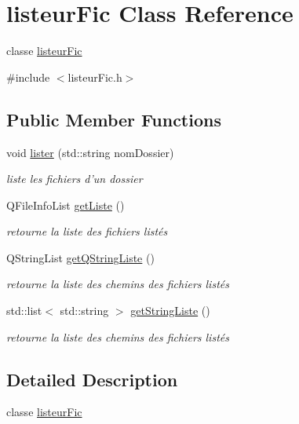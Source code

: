 \hypertarget{classlisteur_fic}{\section{listeur\-Fic Class Reference}
\label{classlisteur_fic}
}


classe \hyperlink{classlisteur_fic}{listeur\-Fic}  




{\ttfamily \#include $<$listeur\-Fic.\-h$>$}

\subsection*{Public Member Functions}
\begin{DoxyCompactItemize}
\item 
void \hyperlink{classlisteur_fic_a9a035fde2cef3b9d70fbabfd98923493}{lister} (std\-::string nom\-Dossier)
\begin{DoxyCompactList}\small\item\em liste les fichiers d'un dossier \end{DoxyCompactList}\item 
Q\-File\-Info\-List \hyperlink{classlisteur_fic_a319d2a5d9de00dc984907b9256a7552b}{get\-Liste} ()
\begin{DoxyCompactList}\small\item\em retourne la liste des fichiers listés \end{DoxyCompactList}\item 
Q\-String\-List \hyperlink{classlisteur_fic_a769367aff699655d7e42450ac2f4a339}{get\-Q\-String\-Liste} ()
\begin{DoxyCompactList}\small\item\em retourne la liste des chemins des fichiers listés \end{DoxyCompactList}\item 
std\-::list$<$ std\-::string $>$ \hyperlink{classlisteur_fic_a859f53b053cd6f0d38bb36e6ae462b62}{get\-String\-Liste} ()
\begin{DoxyCompactList}\small\item\em retourne la liste des chemins des fichiers listés \end{DoxyCompactList}\end{DoxyCompactItemize}


\subsection{Detailed Description}
classe \hyperlink{classlisteur_fic}{listeur\-Fic} 

